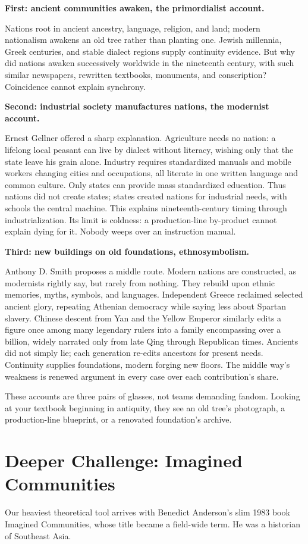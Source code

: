 \textbf{First: ancient communities awaken, the primordialist account.}

Nations root in ancient ancestry, language, religion, and land; modern nationalism awakens an old tree rather than planting one. Jewish millennia, Greek centuries, and stable dialect regions supply continuity evidence. But why did nations awaken successively worldwide in the nineteenth century, with such similar newspapers, rewritten textbooks, monuments, and conscription? Coincidence cannot explain synchrony.

\textbf{Second: industrial society manufactures nations, the modernist account.}

Ernest Gellner offered a sharp explanation. Agriculture needs no nation: a lifelong local peasant can live by dialect without literacy, wishing only that the state leave his grain alone. Industry requires standardized manuals and mobile workers changing cities and occupations, all literate in one written language and common culture. Only states can provide mass standardized education. Thus nations did not create states; states created nations for industrial needs, with schools the central machine. This explains nineteenth-century timing through industrialization. Its limit is coldness: a production-line by-product cannot explain dying for it. Nobody weeps over an instruction manual.

\textbf{Third: new buildings on old foundations, ethnosymbolism.}

Anthony D. Smith proposes a middle route. Modern nations are constructed, as modernists rightly say, but rarely from nothing. They rebuild upon ethnic memories, myths, symbols, and languages. Independent Greece reclaimed selected ancient glory, repeating Athenian democracy while saying less about Spartan slavery. Chinese descent from Yan and the Yellow Emperor similarly edits a figure once among many legendary rulers into a family encompassing over a billion, widely narrated only from late Qing through Republican times. Ancients did not simply lie; each generation re-edits ancestors for present needs. Continuity supplies foundations, modern forging new floors. The middle way's weakness is renewed argument in every case over each contribution's share.

These accounts are three pairs of glasses, not teams demanding fandom. Looking at your textbook beginning in antiquity, they see an old tree's photograph, a production-line blueprint, or a renovated foundation's archive.

\section{Deeper Challenge: Imagined Communities}
Our heaviest theoretical tool arrives with Benedict Anderson's slim 1983 book Imagined Communities, whose title became a field-wide term. He was a historian of Southeast Asia.


